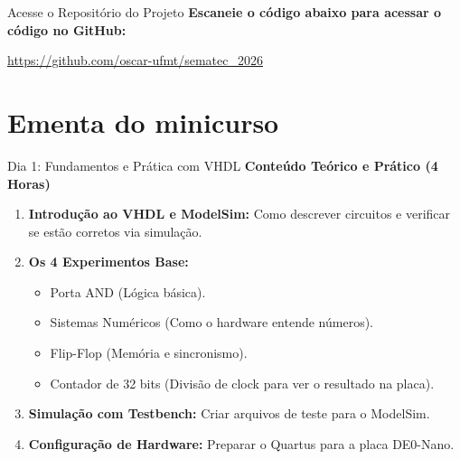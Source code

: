 \documentclass[aspectratio=169]{beamer}
\begin{document}
\begin{frame}{Acesse o Repositório do Projeto}
	\centering
	\textbf{Escaneie o código abaixo para acessar o código no GitHub:} \\
	\vspace{0.5cm}
	
	
	\vspace{0.5cm}
	\url{https://github.com/oscar-ufmt/sematec_2026}
\end{frame}


\section{Ementa do minicurso}
\begin{frame}{Dia 1: Fundamentos e Prática com VHDL}
	\textbf{Conteúdo Teórico e Prático (4 Horas)}
	
	\begin{enumerate}
		\item \textbf{Introdução ao VHDL e ModelSim:} Como descrever circuitos e verificar se estão corretos via simulação.
		\item \textbf{Os 4 Experimentos Base:}
		\begin{itemize}
			\item Porta AND (Lógica básica).
			\item Sistemas Numéricos (Como o hardware entende números).
			\item Flip-Flop (Memória e sincronismo).
			\item Contador de 32 bits (Divisão de clock para ver o resultado na placa).
		\end{itemize}
		\item \textbf{Simulação com Testbench:} Criar arquivos de teste para o ModelSim.
		\item \textbf{Configuração de Hardware:} Preparar o Quartus para a placa DE0-Nano.
	\end{enumerate}
\end{frame}
\end{document}

